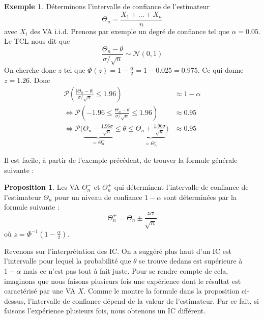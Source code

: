 \documentclass[a4paper,12pt]{report}
\theoremstyle{definition}
\renewcommand{\(}{\left(}
\renewcommand{\)}{\right)}
\renewcommand{\P}{\mathcal{P}}
\newtheorem{exmp}[thm]{Exemple}
\newtheorem{prop}[thm]{Proposition}
\begin{document}
        \begin{exmp}
            Déterminons l'intervalle de confiance de l'estimateur 
            $$\Theta_n=\frac{X_1+\dots+X_n}{n}$$
            avec $X_i$ des VA i.i.d. Prenons par exemple un degré de confiance tel que $\alpha = 0.05$. Le TCL nous dit que $$\frac{\Theta_n-\theta}{\sigma/\sqrt{n}}\sim\mathcal{N}(0,1)$$
            On cherche donc $z$ tel que $\Phi(z)=1-\frac{\alpha}{2}=1-0.025 = 0.975$. Ce qui donne $z=1.26$. Donc
            \begin{align*}
                \P\left( \frac{|\Theta_n-\theta|}{\sigma/\sqrt{n}} \leq 1.96 \right) &\approx 1-\alpha \\
                \Leftrightarrow \P\left( -1.96\leq \frac{\Theta_n-\theta}{\sigma/\sqrt{n}} \leq 1.96 \right) &\approx 0.95 \\
                \Leftrightarrow \P\bigg( \underbrace{\Theta_n-\frac{1.96\sigma}{\sqrt{n}}}_{=\Theta_n^{-}}\leq \theta\leq \underbrace{\Theta_n+\frac{1.96\sigma}{\sqrt{n}}}_{=\Theta_n^{+}} \bigg) &\approx 0.95 
            \end{align*}
        \end{exmp}
        
        Il est facile, à partir de l'exemple précédent, de trouver la formule générale suivante :
        
        \begin{leftbar}
        \begin{prop}
            Les VA $\Theta_n^{-}$ et $\Theta_n^{+}$ qui déterminent l'intervalle de confiance de l'estimateur $\Theta_n$ pour un niveau de confiance $1-\alpha$ sont déterminées par la formule suivante :
            $$\Theta_n^{\pm} = \Theta_n \pm \frac{z\sigma}{\sqrt{n}}$$
            où $z = \Phi^{-1}\left( 1-\frac{\alpha}{2} \right)$.
        \end{prop}
        \end{leftbar}
        
        Revenons sur l'interprétation des IC. On a suggéré plus haut d'un IC est l'intervalle pour lequel la probabilité que $\theta$ se trouve dedans est supérieure à $1-\alpha$ mais ce n'est pas tout à fait juste. Pour se rendre compte de cela, imaginons que nous faisons plusieurs fois une expérience dont le résultat est caractérisé par une VA $X$. Comme le montre la formule dans la proposition ci-dessus, l'intervalle de confiance dépend de la valeur de l'estimateur. Par ce fait, si faisons l'expérience plusieurs fois, nous obtenons un IC différent.
        
\end{document}
